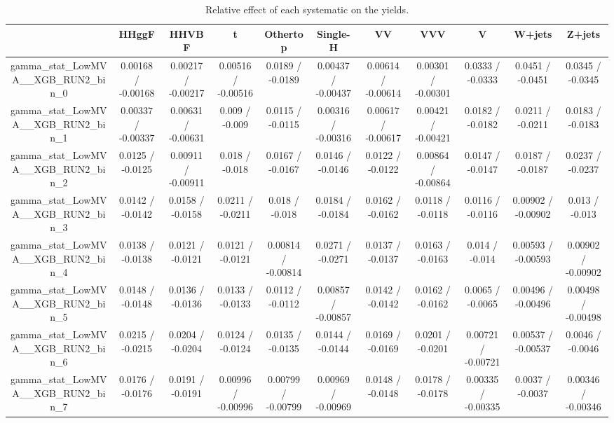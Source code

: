 \documentclass[10pt]{article}
\begin{document}
\begin{table}[htbp]
\begin{center}
\begin{tabular}{|c|c|c|c|c|c|c|c|c|c|c|}
\hline 
      & HHggF      & HHVBF      & t      & Othertop      & Single-H      & VV      & VVV      & V      & W+jets      & Z+jets \\ 
\hline 
  gamma_stat_LowMVA__XGB_RUN2_bin_0 & 0.00168 / -0.00168 & 0.00217 / -0.00217 & 0.00516 / -0.00516 & 0.0189 / -0.0189 & 0.00437 / -0.00437 & 0.00614 / -0.00614 & 0.00301 / -0.00301 & 0.0333 / -0.0333 & 0.0451 / -0.0451 & 0.0345 / -0.0345 \\ 
  gamma_stat_LowMVA__XGB_RUN2_bin_1 & 0.00337 / -0.00337 & 0.00631 / -0.00631 & 0.009 / -0.009 & 0.0115 / -0.0115 & 0.00316 / -0.00316 & 0.00617 / -0.00617 & 0.00421 / -0.00421 & 0.0182 / -0.0182 & 0.0211 / -0.0211 & 0.0183 / -0.0183 \\ 
  gamma_stat_LowMVA__XGB_RUN2_bin_2 & 0.0125 / -0.0125 & 0.00911 / -0.00911 & 0.018 / -0.018 & 0.0167 / -0.0167 & 0.0146 / -0.0146 & 0.0122 / -0.0122 & 0.00864 / -0.00864 & 0.0147 / -0.0147 & 0.0187 / -0.0187 & 0.0237 / -0.0237 \\ 
  gamma_stat_LowMVA__XGB_RUN2_bin_3 & 0.0142 / -0.0142 & 0.0158 / -0.0158 & 0.0211 / -0.0211 & 0.018 / -0.018 & 0.0184 / -0.0184 & 0.0162 / -0.0162 & 0.0118 / -0.0118 & 0.0116 / -0.0116 & 0.00902 / -0.00902 & 0.013 / -0.013 \\ 
  gamma_stat_LowMVA__XGB_RUN2_bin_4 & 0.0138 / -0.0138 & 0.0121 / -0.0121 & 0.0121 / -0.0121 & 0.00814 / -0.00814 & 0.0271 / -0.0271 & 0.0137 / -0.0137 & 0.0163 / -0.0163 & 0.014 / -0.014 & 0.00593 / -0.00593 & 0.00902 / -0.00902 \\ 
  gamma_stat_LowMVA__XGB_RUN2_bin_5 & 0.0148 / -0.0148 & 0.0136 / -0.0136 & 0.0133 / -0.0133 & 0.0112 / -0.0112 & 0.00857 / -0.00857 & 0.0142 / -0.0142 & 0.0162 / -0.0162 & 0.0065 / -0.0065 & 0.00496 / -0.00496 & 0.00498 / -0.00498 \\ 
  gamma_stat_LowMVA__XGB_RUN2_bin_6 & 0.0215 / -0.0215 & 0.0204 / -0.0204 & 0.0124 / -0.0124 & 0.0135 / -0.0135 & 0.0144 / -0.0144 & 0.0169 / -0.0169 & 0.0201 / -0.0201 & 0.00721 / -0.00721 & 0.00537 / -0.00537 & 0.0046 / -0.0046 \\ 
  gamma_stat_LowMVA__XGB_RUN2_bin_7 & 0.0176 / -0.0176 & 0.0191 / -0.0191 & 0.00996 / -0.00996 & 0.00799 / -0.00799 & 0.00969 / -0.00969 & 0.0148 / -0.0148 & 0.0178 / -0.0178 & 0.00335 / -0.00335 & 0.0037 / -0.0037 & 0.00346 / -0.00346 \\ 
\hline 
\end{tabular} 
\caption{Relative effect of each systematic on the yields.} 
\end{center} 
\end{table} 
\end{document}
